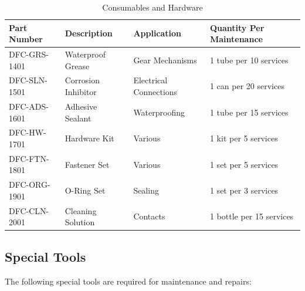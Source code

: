 \documentclass[12pt,a4paper,twoside,openright]{book}
\newcommand{\tabletextfont}{\normalfont\rmfamily}
\newcommand{\tableheadfont}{\normalfont\bfseries}
\begin{document}
\begin{table}[h]
\centering
\setlength{\tabcolsep}{5pt} %
\begin{tabular}{|p{}|p{}|p{}|p{}|}
\hline
\tableheadfont\textbf{Part Number} & \tableheadfont\textbf{Description} & \tableheadfont\textbf{Application} & \tableheadfont\textbf{Quantity Per Maintenance} \\
\hline
\tabletextfont DFC-GRS-1401 & Waterproof Grease & Gear Mechanisms & 1 tube per 10 services \\
\hline
\tabletextfont DFC-SLN-1501 & Corrosion Inhibitor & Electrical Connections & 1 can per 20 services \\
\hline
\tabletextfont DFC-ADS-1601 & Adhesive Sealant & Waterproofing & 1 tube per 15 services \\
\hline
\tabletextfont DFC-HW-1701 & Hardware Kit & Various & 1 kit per 5 services \\
\hline
\tabletextfont DFC-FTN-1801 & Fastener Set & Various & 1 set per 5 services \\
\hline
\tabletextfont DFC-ORG-1901 & O-Ring Set & Sealing & 1 set per 3 services \\
\hline
\tabletextfont DFC-CLN-2001 & Cleaning Solution & Contacts & 1 bottle per 15 services \\
\hline
\end{tabular}
\caption{Consumables and Hardware}
\end{table}

\subsection{Special Tools}

The following special tools are required for maintenance and repairs:
\end{document}
